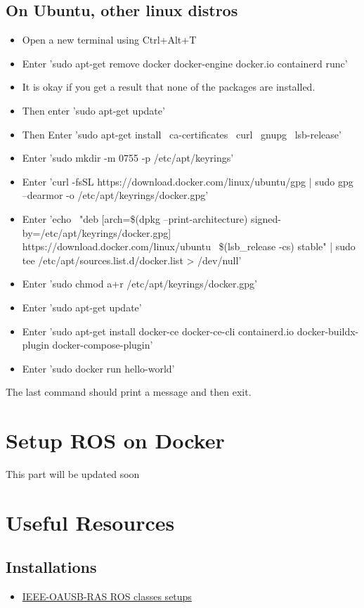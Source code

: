 \documentclass[11pt,fleqn]{book} %
\begin{document}
\section{On Ubuntu, other linux distros}
\begin{itemize}
    \item Open a new terminal using Ctrl+Alt+T
    \item Enter 'sudo apt-get remove docker docker-engine docker.io containerd runc'
    \item It is okay if you get a result that none of the packages are installed.
    \item Then enter 'sudo apt-get update'
    \item Then Enter 
        'sudo apt-get install \
            ca-certificates \
            curl \
            gnupg \
            lsb-release'
    \item Enter 'sudo mkdir -m 0755 -p /etc/apt/keyrings'
    \item Enter 'curl -fsSL https://download.docker.com/linux/ubuntu/gpg | sudo gpg --dearmor -o /etc/apt/keyrings/docker.gpg'
    \item Enter 
        'echo \
        "deb [arch=\$(dpkg --print-architecture) signed-by=/etc/apt/keyrings/docker.gpg] https://download.docker.com/linux/ubuntu \
        \$(lsb\_release -cs) stable" | sudo tee /etc/apt/sources.list.d/docker.list > /dev/null'
    \item Enter 'sudo chmod a+r /etc/apt/keyrings/docker.gpg'
    \item Enter 'sudo apt-get update'
    \item Enter 'sudo apt-get install docker-ce docker-ce-cli containerd.io docker-buildx-plugin docker-compose-plugin'
    \item Enter 'sudo docker run hello-world'
\end{itemize}
The last command should print a message and then exit. 

\chapter{Setup ROS on Docker}
This part will be updated soon

\chapter{Useful Resources}
\section{Installations}
\begin{itemize}
    \item \hyperlink{https://github.com/emmanuel-olateju/ROS_tutorial/blob/main/00.essentials_setup/00.Essentials_setup.pdf}{IEEE-OAUSB-RAS ROS classes setups}
\end{itemize}
\end{document}
